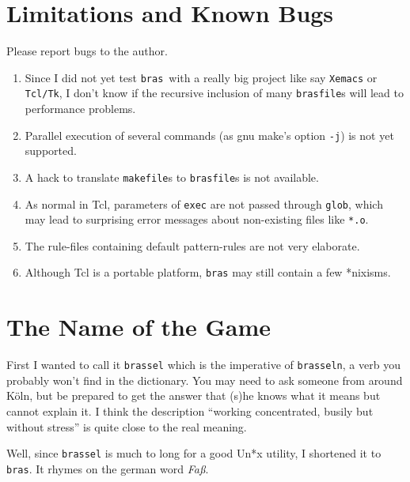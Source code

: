 \documentclass[11pt,bibtotoc,idxtotoc]{scrreprt}
\newcommand{\bras}{\texttt{bras}}
\begin{document}
\section{Limitations and Known Bugs}
Please report bugs to the author.
\begin{enumerate}
\item Since I did not yet test \bras\ with a really big project like
  say \texttt{Xemacs} or \texttt{Tcl/Tk}, I don't know if the
  recursive inclusion of many \texttt{brasfile}s will lead to
  performance problems.

\item Parallel execution of several commands (as gnu make's option
  \texttt{-j}) is not yet supported.
  
\item A hack to translate \texttt{makefile}s to \texttt{brasfile}s is
  not available.
  
\item As normal in Tcl, parameters of \texttt{exec} are not passed
  through \texttt{glob}, which may lead to surprising error messages
  about non-existing files like \texttt{*.o}.
  
\item The rule-files containing default pattern-rules are not very
  elaborate.
  
\item Although Tcl is a portable platform, \bras{} may still contain a
  few *nixisms.
\end{enumerate}

\section{The Name of the Game}

First I wanted to call it \texttt{brassel} which is the imperative of
\texttt{brasseln}, a verb you probably won't find in the
dictionary. You may need to ask someone from around K\"oln, but be
prepared to get the answer that (s)he knows what it means but cannot
explain it. I think the description "`working concentrated, busily but
without stress"' is quite close to the real meaning.

Well, since \texttt{brassel} is much to long for a good
Un*x utility, I shortened it to \bras. It rhymes on the german word
\textit{Fa\ss}.

\end{document}
